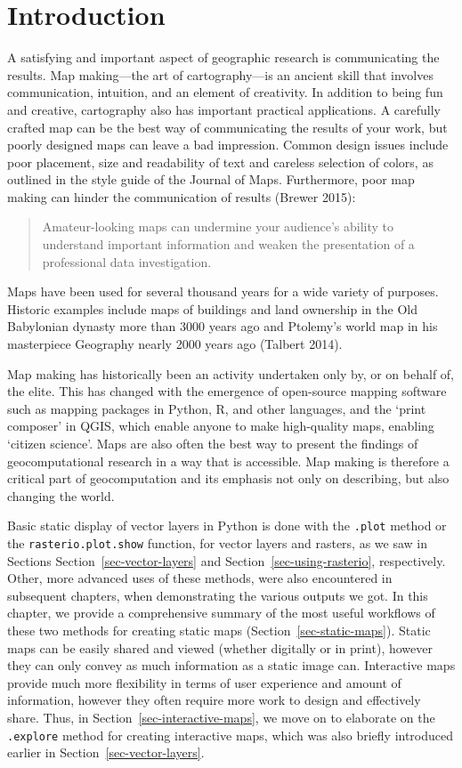 \documentclass[
  letterpaper,
]{krantz}
\begin{document}
\section{Introduction}\label{introduction-7}

A satisfying and important aspect of geographic research is
communicating the results. Map making---the art of cartography---is an
ancient skill that involves communication, intuition, and an element of
creativity. In addition to being fun and creative, cartography also has
important practical applications. A carefully crafted map can be the
best way of communicating the results of your work, but poorly designed
maps can leave a bad impression. Common design issues include poor
placement, size and readability of text and careless selection of
colors, as outlined in the style guide of the Journal of Maps.
Furthermore, poor map making can hinder the communication of results
(Brewer 2015):

\begin{quote}
Amateur-looking maps can undermine your audience's ability to understand
important information and weaken the presentation of a professional data
investigation.
\end{quote}

Maps have been used for several thousand years for a wide variety of
purposes. Historic examples include maps of buildings and land ownership
in the Old Babylonian dynasty more than 3000 years ago and Ptolemy's
world map in his masterpiece Geography nearly 2000 years ago (Talbert
2014).

Map making has historically been an activity undertaken only by, or on
behalf of, the elite. This has changed with the emergence of open-source
mapping software such as mapping packages in Python, R, and other
languages, and the `print composer' in QGIS, which enable anyone to make
high-quality maps, enabling `citizen science'. Maps are also often the
best way to present the findings of geocomputational research in a way
that is accessible. Map making is therefore a critical part of
geocomputation and its emphasis not only on describing, but also
changing the world.

Basic static display of vector layers in Python is done with the
\texttt{.plot} method or the \texttt{rasterio.plot.show} function, for
vector layers and rasters, as we saw in Sections
Section~\ref{sec-vector-layers} and Section~\ref{sec-using-rasterio},
respectively. Other, more advanced uses of these methods, were also
encountered in subsequent chapters, when demonstrating the various
outputs we got. In this chapter, we provide a comprehensive summary of
the most useful workflows of these two methods for creating static maps
(Section~\ref{sec-static-maps}). Static maps can be easily shared and
viewed (whether digitally or in print), however they can only convey as
much information as a static image can. Interactive maps provide much
more flexibility in terms of user experience and amount of information,
however they often require more work to design and effectively share.
Thus, in Section~\ref{sec-interactive-maps}, we move on to elaborate on
the \texttt{.explore} method for creating interactive maps, which was
also briefly introduced earlier in Section~\ref{sec-vector-layers}.
\end{document}
